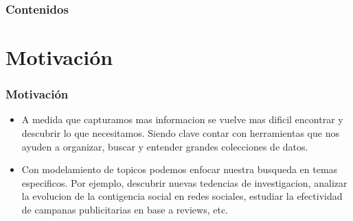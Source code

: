 \documentclass[
	spanish, %
	aspectratio=43, %
	hyperref={pdfencoding=auto,psdextra},
	xcolor={dvipsnames,table,usenames}
]{beamer}
\title[\documentsubtitle]{\documenttitle}
\subtitle{\documentsubject}
\author[\documentauthor]{
	\documentauthor \newline\newline
Profesor guía: Richard Weber \newline
Miembros de la comisión: Giorgiogiulio Parra, Ángel Jiménez
}
\institute[UChile]{
	\texttt{[image: \\universitydepartmentimage]} \\
	\medskip
	\universityname \\
	\universityfaculty \\
	\universitydepartment
}
\date[\today]{\footnotesize{\today}}
\begin{document}
\templatePagecfg

\templateFinalcfg




\begin{frame}
	\frametitle{Contenidos}
	\tableofcontents
\end{frame}


\section{Motivación}

\begin{frame}

\frametitle{Motivación} 

\begin{itemize}
  \item A medida que capturamos mas informacion se vuelve mas dificil encontrar y descubrir lo que necesitamos. Siendo clave contar con herramientas que nos ayuden a organizar, buscar y entender grandes colecciones de datos.
  \item Con modelamiento de topicos podemos enfocar nuestra busqueda en temas especificos. Por ejemplo, descubrir nuevas tedencias de investigacion, analizar la evolucion de la contigencia social en redes sociales, estudiar la efectividad de campanas publicitarias en base a reviews, etc.
\end{itemize}



\end{frame}
\end{document}
